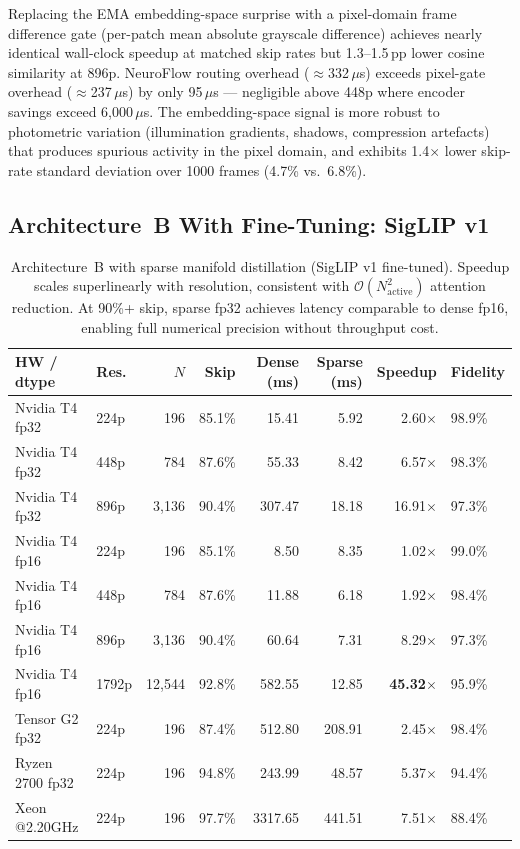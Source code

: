 \documentclass{article}
\begin{document}
Replacing the EMA embedding-space surprise with a pixel-domain frame
difference gate (per-patch mean absolute grayscale difference) achieves
nearly identical wall-clock speedup at matched skip rates but 1.3--1.5\,pp
lower cosine similarity at 896p. NeuroFlow routing overhead
($\approx$332\,$\mu$s) exceeds pixel-gate overhead ($\approx$237\,$\mu$s)
by only 95\,$\mu$s — negligible above 448p where encoder savings exceed
6{,}000\,$\mu$s. The embedding-space signal is more robust to photometric
variation (illumination gradients, shadows, compression artefacts) that
produces spurious activity in the pixel domain, and exhibits 1.4$\times$
lower skip-rate standard deviation over 1000 frames (4.7\% vs.\ 6.8\%).

\subsection{Architecture~B With Fine-Tuning: SigLIP v1}
\label{sec:arch_b_ft}

\begin{table}[ht]
\centering
\setlength{\tabcolsep}{5pt}
\begin{tabular}{llrrrrrl}
\toprule
\textbf{HW / dtype} & \textbf{Res.} & \textbf{$N$}
  & \textbf{Skip} & \textbf{Dense (ms)} & \textbf{Sparse (ms)}
  & \textbf{Speedup} & \textbf{Fidelity} \\
\midrule
Nvidia T4 fp32 & 224p  &      196 & 85.1\% &   15.41 &  5.92 &  2.60$\times$ & 98.9\% \\
Nvidia T4 fp32 & 448p  &      784 & 87.6\% &   55.33 &  8.42 &  6.57$\times$ & 98.3\% \\
Nvidia T4 fp32 & 896p  &    3{,}136 & 90.4\% &  307.47 & 18.18 & 16.91$\times$ & 97.3\% \\
\midrule
Nvidia T4 fp16 & 224p  &      196 & 85.1\% &    8.50 &  8.35 &  1.02$\times$ & 99.0\% \\
Nvidia T4 fp16 & 448p  &      784 & 87.6\% &   11.88 &  6.18 &  1.92$\times$ & 98.4\% \\
Nvidia T4 fp16 & 896p  &    3{,}136 & 90.4\% &   60.64 &  7.31 &  8.29$\times$ & 97.3\% \\
Nvidia T4 fp16 & 1792p & 12{,}544 & 92.8\% &  582.55 & 12.85 & \textbf{45.32}$\times$ & 95.9\% \\
\midrule
Tensor G2 fp32 & 224p  &      196 & 87.4\% &  512.80 & 208.91 &  2.45$\times$ & 98.4\% \\
Ryzen 2700 fp32 & 224p &      196 & 94.8\% &  243.99 &  48.57 &  5.37$\times$ & 94.4\% \\
Xeon @2.20GHz & 224p   &      196 & 97.7\% & 3317.65 & 441.51 &  7.51$\times$ & 88.4\% \\
\bottomrule
\end{tabular}
\caption{Architecture~B with sparse manifold distillation (SigLIP v1
fine-tuned). Speedup scales superlinearly with resolution, consistent
with $\mathcal{O}(N_{\text{active}}^2)$ attention reduction. At 90\%+
skip, sparse fp32 achieves latency comparable to dense fp16, enabling
full numerical precision without throughput cost.}
\label{tab:arch_b_ft}
\end{table}
\end{document}
